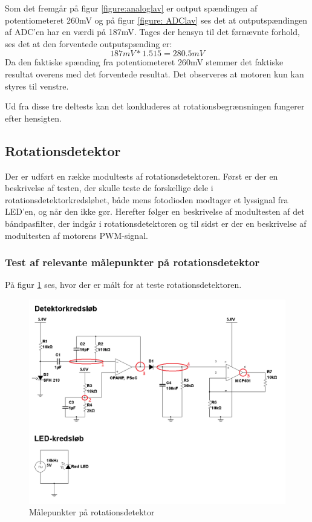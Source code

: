 \noindent Som det fremgår på figur \ref{figure:analoglav} er output spændingen af potentiometeret 260mV og på figur \ref{figure: ADClav} ses det at outputspændingen af ADC’en har en værdi på 187mV. Tages der hensyn til det førnævnte forhold, ses det at den forventede outputspænding er:
\begin{equation}
187mV * 1.515 = 280.5mV
\end{equation}
Da den faktiske spænding fra potentiometeret 260mV stemmer det faktiske resultat overens med det forventede resultat. Det observeres at motoren kun kan styres til venstre. \newline

\noindent Ud fra disse tre deltests kan det konkluderes at rotationsbegrænsningen fungerer efter hensigten.


\subsection{Rotationsdetektor}
Der er udført en række modultests af rotationsdetektoren. Først er der en beskrivelse af testen, der skulle teste de forskellige dele i rotationsdetektorkredsløbet, både mens fotodioden modtager et lyssignal fra LED'en, og når den ikke gør. Herefter følger en beskrivelse af modultesten af det båndpasfilter, der indgår i rotationsdetektoren og til sidst er der en beskrivelse af modultesten af motorens PWM-signal. 

\subsubsection{Test af relevante målepunkter på rotationsdetektor}
På figur \ref{fig:målepunkter} ses, hvor der er målt for at teste rotationsdetektoren. 

\begin{figure}[H]
	\centering
	\includegraphics[width=\textwidth]{Test/images/rotationsdetektor_maalepunkter}
	\caption{Målepunkter på rotationsdetektor}
	\label{fig:målepunkter}
\end{figure}

